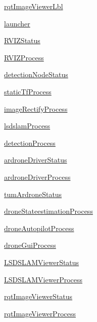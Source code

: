 \begin{DoxyCompactItemize}
\hyperlink{classstaircaseai_1_1staircaseAI_a40b886c5b0bd0895901671e0bdc1a006}{rqt\-Image\-Viewer\-Lbl}
\item 
\hyperlink{classstaircaseai_1_1staircaseAI_a833c982cff34fb60a0fb6f66f80efb25}{launcher}
\item 
\hyperlink{classstaircaseai_1_1staircaseAI_ac9966f9d12d8d3e73f0c5ac6891243c6}{R\-V\-I\-Z\-Status}
\item 
\hyperlink{classstaircaseai_1_1staircaseAI_a54bcc18605f2331eeb8d42a0709b3590}{R\-V\-I\-Z\-Process}
\item 
\hyperlink{classstaircaseai_1_1staircaseAI_ad3fdf6d0b4f17644da041f09e15b3ca7}{detection\-Node\-Status}
\item 
\hyperlink{classstaircaseai_1_1staircaseAI_a01c439ebe7570405bb22f82ba5a0bb3e}{static\-Tf\-Process}
\item 
\hyperlink{classstaircaseai_1_1staircaseAI_a77b90c85075237529ae93835fd2af2bd}{image\-Rectify\-Process}
\item 
\hyperlink{classstaircaseai_1_1staircaseAI_a5e60775b7acf386fc10cb0ef2f118bc8}{lsdslam\-Process}
\item 
\hyperlink{classstaircaseai_1_1staircaseAI_a87462cc129cb86ab0aaef5b8731cba6c}{detection\-Process}
\item 
\hyperlink{classstaircaseai_1_1staircaseAI_a2f76e2a18d929a8d80ed7d8090e3884a}{ardrone\-Driver\-Status}
\item 
\hyperlink{classstaircaseai_1_1staircaseAI_a1dcc49f394aa217782d18a252c095d91}{ardrone\-Driver\-Process}
\item 
\hyperlink{classstaircaseai_1_1staircaseAI_af27dfa875e03ac7646b25a655318e7e6}{tum\-Ardrone\-Status}
\item 
\hyperlink{classstaircaseai_1_1staircaseAI_a7e495d7bf55a5c90c7b6c342d93e3f58}{drone\-Stateestimation\-Process}
\item 
\hyperlink{classstaircaseai_1_1staircaseAI_a40cdd3e980ae70333a716ceb08dde2bf}{drone\-Autopilot\-Process}
\item 
\hyperlink{classstaircaseai_1_1staircaseAI_ac4392e3c93f4aedf23195b659ccef0c1}{drone\-Gui\-Process}
\item 
\hyperlink{classstaircaseai_1_1staircaseAI_ae6980c88f11e387fec4f4558e1fd60ec}{L\-S\-D\-S\-L\-A\-M\-Viewer\-Status}
\item 
\hyperlink{classstaircaseai_1_1staircaseAI_ac0e22a971bbe5e53dc1e085f7d4053b4}{L\-S\-D\-S\-L\-A\-M\-Viewer\-Process}
\item 
\hyperlink{classstaircaseai_1_1staircaseAI_a3bf21dbce86df4212e2a71d8449acfd3}{rqt\-Image\-Viewer\-Status}
\item 
\hyperlink{classstaircaseai_1_1staircaseAI_a6d00dba2967e83eb5114c61381a1db29}{rqt\-Image\-Viewer\-Process}
\end{DoxyCompactItemize}
